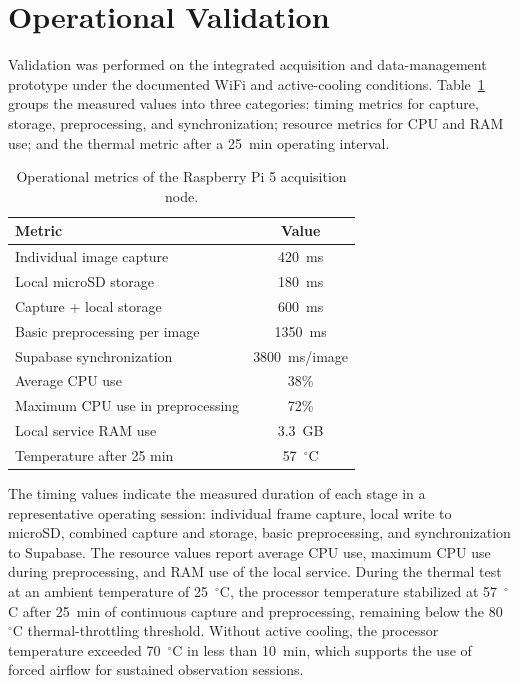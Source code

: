 \documentclass[conference,a4paper]{IEEEtran}
\begin{document}
\section{Operational Validation}

Validation was performed on the integrated acquisition and data-management prototype under the documented WiFi and active-cooling conditions. Table~\ref{tab:operational-metrics} groups the measured values into three categories: timing metrics for capture, storage, preprocessing, and synchronization; resource metrics for CPU and RAM use; and the thermal metric after a 25~min operating interval.

\begin{table}[t]
\caption{Operational metrics of the Raspberry Pi 5 acquisition node.}
\label{tab:operational-metrics}
\centering
\begin{tabular}{lc}
\hline
\textbf{Metric} & \textbf{Value} \\
\hline
Individual image capture & 420~ms \\
Local microSD storage & 180~ms \\
Capture + local storage & 600~ms \\
Basic preprocessing per image & 1350~ms \\
Supabase synchronization & 3800~ms/image \\
Average CPU use & 38\% \\
Maximum CPU use in preprocessing & 72\% \\
Local service RAM use & 3.3~GB \\
Temperature after 25 min & 57~$^\circ$C \\
\hline
\end{tabular}
\end{table}

The timing values indicate the measured duration of each stage in a representative operating session: individual frame capture, local write to microSD, combined capture and storage, basic preprocessing, and synchronization to Supabase. The resource values report average CPU use, maximum CPU use during preprocessing, and RAM use of the local service. During the thermal test at an ambient temperature of 25~$^\circ$C, the processor temperature stabilized at 57~$^\circ$C after 25~min of continuous capture and preprocessing, remaining below the 80~$^\circ$C thermal-throttling threshold. Without active cooling, the processor temperature exceeded 70~$^\circ$C in less than 10~min, which supports the use of forced airflow for sustained observation sessions.
\end{document}
